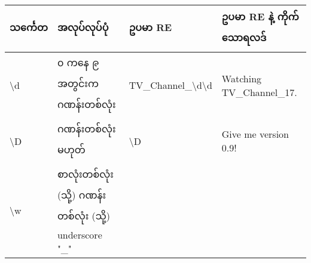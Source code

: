 \documentclass[11pt]{article}
\begin{document}
\begin{longtable}[c]{@{}llll@{}}
\toprule
\begin{minipage}[b]{0.12\columnwidth}\raggedright\strut
သင်္ကေတ
\strut\end{minipage} &
\begin{minipage}[b]{0.15\columnwidth}\raggedright\strut
အလုပ်လုပ်ပုံ
\strut\end{minipage} &
\begin{minipage}[b]{0.12\columnwidth}\raggedright\strut
ဥပမာ RE
\strut\end{minipage} &
\begin{minipage}[b]{0.10\columnwidth}\raggedright\strut
ဥပမာ RE နဲ့ ကိုက်သောရလဒ်
\strut\end{minipage}\tabularnewline
\midrule
\endhead
\begin{minipage}[t]{0.12\columnwidth}\raggedright\strut
\textbackslash{}d
\strut\end{minipage} &
\begin{minipage}[t]{0.15\columnwidth}\raggedright\strut
၀ ကနေ ၉ အတွင်းက ဂဏန်းတစ်လုံး
\strut\end{minipage} &
\begin{minipage}[t]{0.12\columnwidth}\raggedright\strut
TV\_Channel\_\textbackslash{}d\textbackslash{}d
\strut\end{minipage} &
\begin{minipage}[t]{0.10\columnwidth}\raggedright\strut
Watching {TV\_Channel\_17}.
\strut\end{minipage}\tabularnewline
\begin{minipage}[t]{0.12\columnwidth}\raggedright\strut
\textbackslash{}D
\strut\end{minipage} &
\begin{minipage}[t]{0.15\columnwidth}\raggedright\strut
ဂဏန်းတစ်လုံး မဟုတ်
\strut\end{minipage} &
\begin{minipage}[t]{0.12\columnwidth}\raggedright\strut
\textbackslash{}D
\strut\end{minipage} &
\begin{minipage}[t]{0.10\columnwidth}\raggedright\strut
{Give me version} 0{.}9{!}
\strut\end{minipage}\tabularnewline
\begin{minipage}[t]{0.12\columnwidth}\raggedright\strut
\textbackslash{}w
\strut\end{minipage} &
\begin{minipage}[t]{0.15\columnwidth}\raggedright\strut
စာလုံးတစ်လုံး (သို့) ဂဏန်းတစ်လုံး (သို့) underscore "\_" \textbar{}

\end{minipage}
\end{longtable}
\end{document}
